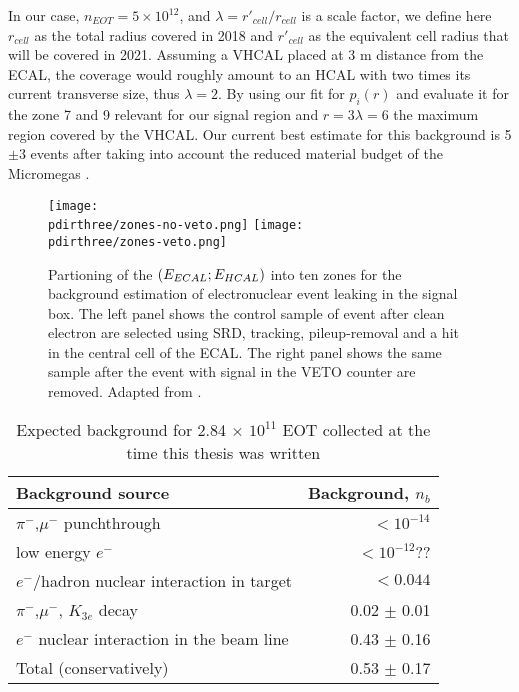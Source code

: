 In our case, $n_{EOT} = 5 \times 10^{12}$, and $\lambda = r'_{cell}/r_{cell}$ is a scale factor, we define here $r_{cell}$ as the total radius covered in 2018 and $r'_{cell}$ as the equivalent cell radius that will be covered in 2021. Assuming a VHCAL placed at 3 \si{\meter} distance from the ECAL, the coverage would roughly amount to an HCAL with two times its current transverse size, thus $\lambda = 2$. By using our fit for $p_i(r)$ and evaluate it for the zone 7 and 9 relevant for our signal region and $r = 3\lambda = 6$ the maximum region covered by the VHCAL. Our current best estimate for this background is 5$\pm$3 events after taking into account the reduced material budget of the Micromegas \cite{pdegen-thesis}. 


\begin{figure}[tbh!]
  \centering
  \texttt{[image: \\pdirthree/zones-no-veto.png]}
  \texttt{[image: \\pdirthree/zones-veto.png]}
  \caption[electronuclear background estimation]{Partioning of the $(E_{ECAL};E_{HCAL})$ into ten zones for the background estimation of electronuclear event leaking in the signal box. The left panel shows the control sample of event after clean electron are selected using SRD, tracking, pileup-removal and a hit in the central cell of the ECAL. The right panel shows the same sample after the event with signal in the VETO counter are removed. Adapted from \cite{na64-neutrals-study}.}
  \label{fig:enucl-bkg-estimation}
\end{figure}

\begin{table}[bth!]
  \centering
  \caption[Invisible mode background]{Expected background for 2.84 $\times$ $10^{11}$ EOT collected at the time this thesis was written \cite{NA64:2019imj}}
  \begin{tabular}{lr}
    \hline \hline
    Background source & Background, $n_b$ \\
    \hline
    $\pi^-$,$\mu^-$ punchthrough                      & $<10^{-14}$ \\
    low energy $e^-$                                  & $<10^{-12}$?? \\
    $e^-$/hadron nuclear interaction in target        & $<0.044$ \\
    $\pi^-$,$\mu^-$, $K_{3e}$ decay                    & 0.02 $\pm$ 0.01 \\
    $e^-$ nuclear interaction in the  beam line       & 0.43 $\pm$ 0.16 \\
    \hline
    Total (conservatively)                            & 0.53 $\pm$ 0.17 \\
    \hline \hline                       
  \end{tabular}
  \label{tab:inv-bkg}
\end{table}

